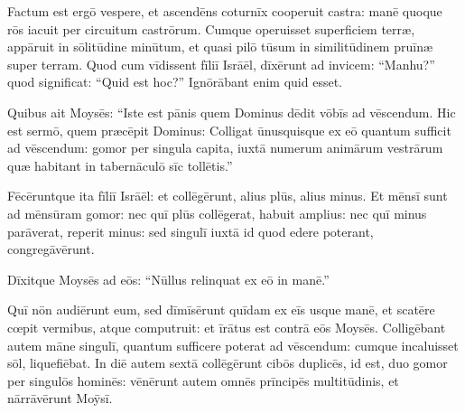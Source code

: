 Factum est ergō vespere, et ascendēns coturnīx
cooperuit castra: manē 
quoque rōs iacuit per circuitum castrōrum. Cumque operuisset superficiem
terræ, appāruit in
sōlitūdine minūtum, et quasi  pilō tūsum in
similitūdinem pruīnæ super terram. Quod
cum vīdissent fīliī Isrāēl, dīxērunt ad invicem: ``Manhu?'' quod significat: ``Quid est
hoc?'' Ignōrābant enim quid esset. 

Quibus ait Moysēs: ``Iste est pānis quem
Dominus dēdit vōbīs ad vēscendum. Hic est sermō, quem
præcēpit Dominus: Colligat ūnusquisque ex eō
quantum sufficit ad vēscendum: gomor per singula capita,
iuxtā numerum animārum vestrārum quæ habitant in
tabernāculō sīc tollētis.''

Fēcēruntque ita fīliī Isrāēl:
et collēgērunt, alius plūs, alius minus. Et mēnsī sunt
ad 
mēnsūram gomor: nec quī plūs collēgerat, habuit
amplius: nec quī minus parāverat, reperit minus: sed
singulī iuxtā id quod edere poterant, congregāvērunt. 

Dīxitque Moysēs ad eōs: ``Nūllus relinquat ex eō in manē.''

Quī nōn audiērunt eum, sed
dīmīsērunt quīdam ex eīs usque manē, et scatēre cœpit
vermibus, atque computruit: et īrātus est
contrā eōs Moysēs. Colligēbant autem māne singulī,
quantum sufficere poterat ad vēscendum: cumque incaluisset
sōl, liquefiēbat. In diē autem sextā collēgērunt cibōs
duplicēs, id est, duo gomor per singulōs hominēs: vēnērunt
autem omnēs prīncipēs multitūdinis, et nārrāvērunt Moȳsī. 

